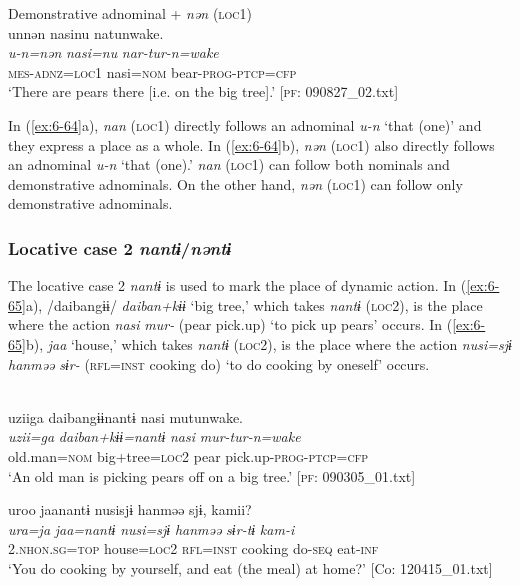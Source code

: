 \ex Demonstrative adnominal + \textit{nən} (\textsc{loc1})\\
{\TM}
\glll  unnən  nasinu  natunwake.\\
\textit{u-n=nən}  \textit{nasi=nu}  \textit{nar-tur-n=wake}\\
\textsc{mes}-\textsc{adnz}=\textsc{loc1}  nasi=\textsc{nom}  bear-\textsc{prog}-\textsc{ptcp}=\textsc{cfp}\\
\glt ‘There are pears there [i.e. on the big tree].’ [\textsc{pf}: 090827\_02.txt]
\z
\z

In (\ref{ex:6-64}a), \textit{nan} (\textsc{loc1}) directly follows an adnominal \textit{u-n} ‘that (one)’ and they express a place as a whole. In (\ref{ex:6-64}b), \textit{nən} (\textsc{loc1}) also directly follows an adnominal \textit{u-n} ‘that (one).’ \textit{nan} (\textsc{loc1}) can follow both nominals and demonstrative adnominals. On the other hand, \textit{nən} (\textsc{loc1}) can follow only demonstrative adnominals.

\subsubsection{Locative case 2 \textit{nantɨ}/\textit{nəntɨ}}

The locative case 2 \textit{nantɨ} is used to mark the place of dynamic action. In (\ref{ex:6-65}a), /daibangɨɨ/ \textit{daiban+kɨɨ} ‘big tree,’ which takes \textit{nantɨ} (\textsc{loc2}), is the place where the action \textit{nasi} \textit{mur-} (pear pick.up) ‘to pick up pears’ occurs. In (\ref{ex:6-65}b), \textit{jaa} ‘house,’ which takes \textit{nantɨ} (\textsc{loc2}), is the place where the action \textit{nusi=sjɨ} \textit{hanməə} \textit{sɨr-} (\textsc{rfl}=\textsc{inst} cooking do) ‘to do cooking by oneself’ occurs.

\ea\label{ex:6-65}
\ea\relax[= \REF{ex:6-53}]\\
{\TM}
\glll  uziiga  daibangɨɨnantɨ  nasi  mutunwake.\\
\textit{uzii=ga}  \textit{daiban+kɨɨ=nantɨ}  \textit{nasi}  \textit{mur-tur-n=wake}\\
old.man=\textsc{nom}  big+tree=\textsc{loc2}  pear  pick.up-\textsc{prog}-\textsc{ptcp}=\textsc{cfp}\\
\glt ‘An old man is picking pears off on a big tree.’ [\textsc{pf}: 090305\_01.txt]

\ex
{\TM}
\glll uroo  jaanantɨ  nusisjɨ  hanməə  sjɨ,  kamii?\\
\textit{ura=ja}  \textit{jaa=nantɨ}  \textit{nusi=sjɨ}  \textit{hanməə}  \textit{sɨr-tɨ}  \textit{kam-i}\\
2.\textsc{nhon}.\textsc{sg}=\textsc{top}  house=\textsc{loc2}  \textsc{rfl}=\textsc{inst}  cooking  do-\textsc{seq}  eat-\textsc{inf}\\
\glt ‘You do cooking by yourself, and eat (the meal) at home?’ [Co: 120415\_01.txt]
\z
\z

